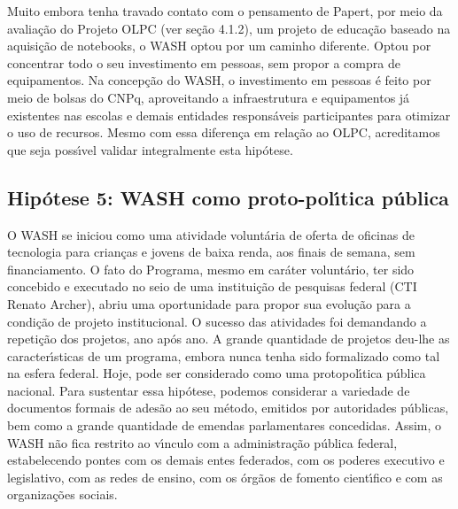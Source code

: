 \documentclass[
12pt,		%
openright,	%
twoside,  %
a4paper,			%
chapter=TITLE,		%
english,			%
french,				%
spanish,			%
brazil				%
]{USPSC-classe/USPSC}
\begin{document}
Muito embora tenha travado contato com o pensamento de Papert, por meio da avalia\c{c}\~ao do Projeto OLPC (ver se\c{c}\~ao 4.1.2), um projeto de educa\c{c}\~ao baseado na aquisi\c{c}\~ao de notebooks, o WASH optou por um caminho diferente. Optou por concentrar todo o seu investimento em pessoas, sem propor a compra de equipamentos. Na concep\c{c}\~ao do WASH, o investimento em pessoas \'e feito por meio de bolsas do CNPq, aproveitando a infraestrutura e equipamentos j\'a existentes nas escolas e demais entidades respons\'aveis participantes para otimizar o uso de recursos.  Mesmo com essa diferen\c{c}a em rela\c{c}\~ao ao OLPC, acreditamos que seja poss\'{\i}vel validar integralmente esta hip\'otese.









\subsection[Hip\'otese 5: WASH como proto-pol\'{\i}tica p\'ublica]{Hip\'otese 5: WASH como proto-pol\'{\i}tica p\'ublica}\label{Hip\'otese 5: WASH como proto-pol\'{\i}tica p\'ublica}
O WASH se iniciou como uma atividade volunt\'aria de oferta de oficinas de tecnologia para crian\c{c}as e jovens de baixa renda, aos finais de semana,  sem financiamento. O fato do Programa, mesmo em car\'ater volunt\'ario, ter sido concebido e executado no seio de uma institui\c{c}\~ao de pesquisas federal (CTI Renato Archer), abriu uma oportunidade para propor sua evolu\c{c}\~ao para a condi\c{c}\~ao de projeto institucional. O sucesso das atividades foi demandando a repeti\c{c}\~ao dos projetos, ano ap\'os ano. A grande quantidade de projetos deu-lhe as caracter\'{\i}sticas de um programa, embora nunca tenha sido formalizado como tal na esfera federal.  Hoje, pode ser considerado como uma protopol\'{\i}tica p\'ublica nacional. Para sustentar essa hip\'otese, podemos considerar a variedade de documentos formais de ades\~ao ao seu m\'etodo, emitidos por autoridades p\'ublicas, bem como a grande quantidade de emendas parlamentares concedidas. Assim, o WASH n\~ao fica restrito ao v\'{\i}nculo com a administra\c{c}\~ao p\'ublica federal, estabelecendo pontes com os demais entes federados, com os poderes executivo e legislativo, com as redes de ensino, com os \'org\~aos de fomento cient\'{\i}fico e com as organiza\c{c}\~oes sociais.
\end{document}
